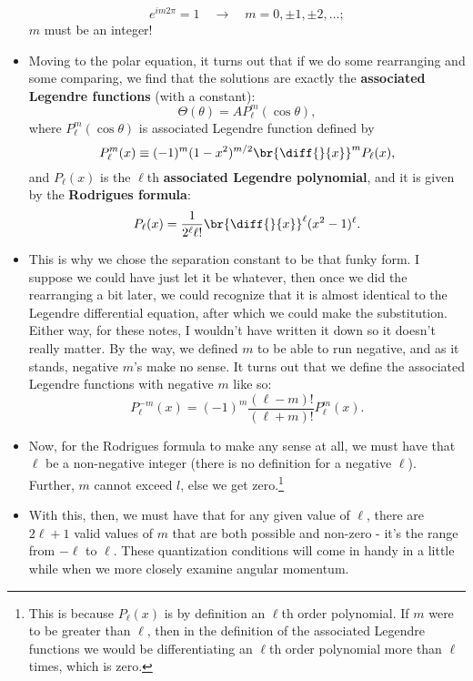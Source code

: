 \begin{itemize}
        \begin{equation*}
            e^{im2\pi} = 1 \quad\rightarrow\quad m=0,\pm1,\pm2,\ldots;
        \end{equation*}
        $m$ must be an integer!
    \item Moving to the polar equation, it turns out that if we do some rearranging and some comparing, we find that the solutions are exactly the \textbf{associated Legendre functions} (with a constant):
        \begin{equation}
            \Theta(\theta) = AP_{\ell}^m(\cos\theta),
        \end{equation}
        where $P_{\ell}^m(\cos\theta)$ is associated Legendre function defined by
        \begin{equation}
            P_{\ell}^m(x) \equiv (-1)^m (1-x^2)^{m/2} \br{\diff{}{x}}^m P_{\ell}(x),
        \end{equation}
        and $P_{\ell}(x)$ is the $\ell$th \textbf{associated Legendre polynomial}, and it is given by the \textbf{Rodrigues formula}:
        \begin{equation}
            P_{\ell}(x) = \frac{1}{2^{\ell} \ell!}\br{\diff{}{x}}^{\ell} (x^2 - 1)^{\ell}.
        \end{equation}
    \item This is why we chose the separation constant to be that funky form. I suppose we could have just let it be whatever, then once we did the rearranging a bit later, we could recognize that it is almost identical to the Legendre differential equation, after which we could make the substitution. Either way, for these notes, I wouldn't have written it down so it doesn't really matter. By the way, we defined $m$ to be able to run negative, and as it stands, negative $m$'s make no sense. It turns out that we define the associated Legendre functions with negative $m$ like so:
        \begin{equation}
            P_{\ell}^{-m}(x) = (-1)^m \frac{(\ell - m)!}{(\ell + m)!}P_{\ell}^m(x).
        \end{equation}
    \item Now, for the Rodrigues formula to make any sense at all, we must have that $\ell$ be a non-negative integer (there is no definition for a negative $\ell$). Further, $m$ cannot exceed $l$, else we get zero.\footnote{This is because $P_{\ell}(x)$ is by definition an $\ell$th order polynomial. If $m$ were to be greater than $\ell$, then in the definition of the associated Legendre functions we would be differentiating an $\ell$th order polynomial more than $\ell$ times, which is zero.}
    \item With this, then, we must have that for any given value of $\ell$, there are $2\ell+1$ valid values of $m$ that are both possible and non-zero - it's the range from $-\ell$ to $\ell$. These quantization conditions will come in handy in a little while when we more closely examine angular momentum.
\end{itemize}


